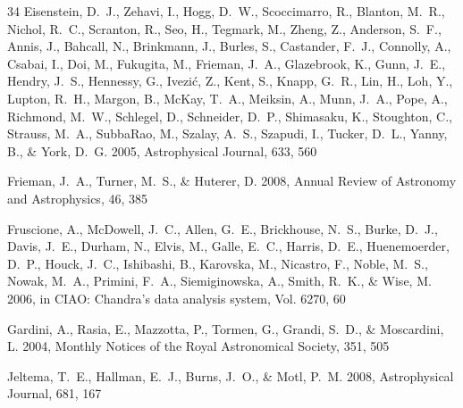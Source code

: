 \documentclass[12pt,preprint]{aastex}
\begin{document}
\begin{thebibliography}{34}
Eisenstein, D.~J., Zehavi, I., Hogg, D.~W., Scoccimarro, R., Blanton, M.~R.,
  Nichol, R.~C., Scranton, R., Seo, H., Tegmark, M., Zheng, Z., Anderson,
  S.~F., Annis, J., Bahcall, N., Brinkmann, J., Burles, S., Castander, F.~J.,
  Connolly, A., Csabai, I., Doi, M., Fukugita, M., Frieman, J.~A., Glazebrook,
  K., Gunn, J.~E., Hendry, J.~S., Hennessy, G., Ivezić, Z., Kent, S., Knapp,
  G.~R., Lin, H., Loh, Y., Lupton, R.~H., Margon, B., {McKay}, T.~A., Meiksin,
  A., Munn, J.~A., Pope, A., Richmond, M.~W., Schlegel, D., Schneider, D.~P.,
  Shimasaku, K., Stoughton, C., Strauss, M.~A., {SubbaRao}, M., Szalay, A.~S.,
  Szapudi, I., Tucker, D.~L., Yanny, B., \& York, D.~G. 2005, Astrophysical
  Journal, 633, 560

Frieman, J.~A., Turner, M.~S., \& Huterer, D. 2008, Annual Review of Astronomy
  and Astrophysics, 46, 385

Fruscione, A., {McDowell}, J.~C., Allen, G.~E., Brickhouse, N.~S., Burke,
  D.~J., Davis, J.~E., Durham, N., Elvis, M., Galle, E.~C., Harris, D.~E.,
  Huenemoerder, D.~P., Houck, J.~C., Ishibashi, B., Karovska, M., Nicastro, F.,
  Noble, M.~S., Nowak, M.~A., Primini, F.~A., Siemiginowska, A., Smith, R.~K.,
  \& Wise, M. 2006, in {CIAO:} Chandra's data analysis system, Vol. 6270, 60

Gardini, A., Rasia, E., Mazzotta, P., Tormen, G., Grandi, S.~D., \& Moscardini,
  L. 2004, Monthly Notices of the Royal Astronomical Society, 351, 505

Jeltema, T.~E., Hallman, E.~J., Burns, J.~O., \& Motl, P.~M. 2008,
  Astrophysical Journal, 681, 167


\end{thebibliography}
\end{document}
